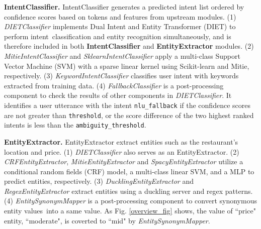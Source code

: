 \textbf{IntentClassifier.} IntentClassifier generates a predicted intent list ordered by confidence scores based on tokens and features from upstream modules.
(1) \textit{DIETClassifier} implements Dual Intent and Entity Transformer (DIET) to perform intent~classification and entity recognition simultaneously, and is therefore included in both \textbf{IntentClassifier} and \textbf{EntityExtractor} modules. %
(2) \textit{MitieIntentClassifier} and \textit{SklearnIntentClassifier} apply a multi-class Support Vector Machine (SVM) \cite{Shmilovici2005} with a sparse linear kernel using Scikit-learn and Mitie, respectively.
(3) \textit{KeywordIntentClassifier} classifies  user intent with keywords extracted from training data.
(4) \textit{FallbackClassifier} is a post-processing component to check the results of other components in \textit{DIETClassifier}. It identifies a user utterance with the intent \texttt{nlu\_fallback} if the confidence scores are not greater than  \texttt{threshold}, or the score difference of the two highest ranked intents is less than the \texttt{ambiguity\_threshold}.

\textbf{EntityExtractor.} EntityExtractor extract entities such as the restaurant's location and price. (1) \textit{DIETClassifier} also serves as an EntityExtractor. 
(2) \textit{CRFEntityExtractor}, \textit{MitieEntityExtractor} and \textit{SpacyEntityExtractor} utilize a conditional random fields (CRF) model, a multi-class linear SVM, and a MLP to predict entities, respectively. 
(3) \textit{DucklingEntityExtractor} and \textit{RegexEntityExtractor} extract entities using a duckling server \cite{duckling} and regex patterns.
(4) \textit{EntitySynonymMapper} is a post-processing component to convert synonymous entity values~into a same value. As Fig. \ref{overview_fig} shows, the value of ``price" entity, ``moderate", is coverted to ``mid" by \textit{EntitySynonymMapper}.


